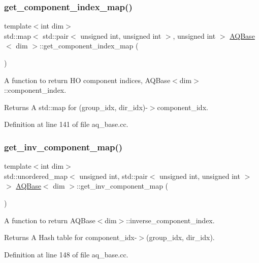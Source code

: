 \subsubsection{\texorpdfstring{get\+\_\+component\+\_\+index\+\_\+map()}{get\_component\_index\_map()}}
{\footnotesize\ttfamily template$<$int dim$>$ \\
std\+::map$<$ std\+::pair$<$ unsigned int, unsigned int $>$, unsigned int $>$ \hyperlink{class_a_q_base}{A\+Q\+Base}$<$ dim $>$\+::get\+\_\+component\+\_\+index\+\_\+map (\begin{DoxyParamCaption}{ }\end{DoxyParamCaption})}

A function to return HO component indices, A\+Q\+Base$<$dim$>$\+::component\+\_\+index.

\begin{DoxyReturn}{Returns}
A std\+::map for (group\+\_\+idx, dir\+\_\+idx)-\/$>$component\+\_\+idx. 
\end{DoxyReturn}


Definition at line 141 of file aq\+\_\+base.\+cc.

\mbox{\label{class_a_q_base_a6c6f10b941afa4019a5d919eee33ebee}} 
\subsubsection{\texorpdfstring{get\+\_\+inv\+\_\+component\+\_\+map()}{get\_inv\_component\_map()}}
{\footnotesize\ttfamily template$<$int dim$>$ \\
std\+::unordered\+\_\+map$<$ unsigned int, std\+::pair$<$ unsigned int, unsigned int $>$ $>$ \hyperlink{class_a_q_base}{A\+Q\+Base}$<$ dim $>$\+::get\+\_\+inv\+\_\+component\+\_\+map (\begin{DoxyParamCaption}{ }\end{DoxyParamCaption})}

A function to return A\+Q\+Base$<$dim$>$\+::inverse\+\_\+component\+\_\+index.

\begin{DoxyReturn}{Returns}
A Hash table for component\+\_\+idx-\/$>$(group\+\_\+idx, dir\+\_\+idx). 
\end{DoxyReturn}


Definition at line 148 of file aq\+\_\+base.\+cc.

